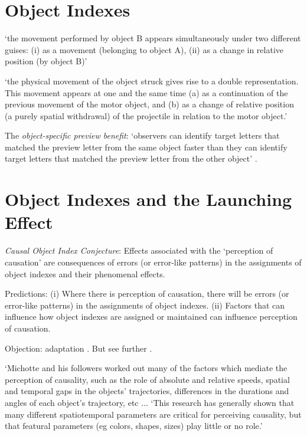 \documentclass[12pt]{extarticle}
\begin{document}
\begin{multicols*}{3}
\section{Object Indexes}

‘the movement performed by object B appears simultaneously under two
different guises: (i) as a movement (belonging to object A), (ii) as a
change in relative position (by object B)’
\citep[p.~136]{Michotte:1946nz}

‘the physical movement of the object struck gives rise to a double
representation. This movement appears at one and the same time (a) as a
continuation of the previous movement of the motor object, and (b) as a
change of relative position (a purely spatial withdrawal) of the projectile
in relation to the motor object.’
\citep[p.~140]{Michotte:1946nz}

The \emph{object-specific preview benefit}: ‘observers can identify target
letters that matched the preview letter from the same object faster than
they can identify target letters that matched the preview letter from the
other object’ \citep[p.\ 2]{Krushke:1996ge}.





\section{Object Indexes and the Launching Effect}

\emph{Causal Object Index Conjecture}:
Effects associated with the ‘perception of causation’
are consequences of errors (or error-like patterns) in the assignments of object indexes and
their phenomenal effects.

Predictions:
(i) Where there is perception of causation, there will be errors (or error-like patterns)
in the assignments of object indexes.
(ii) Factors that can influence how object indexes are assigned or maintained can influence
perception of causation.

Objection: adaptation \citep{rolfs:2013_visual}.
But see further \citet{johnston:2013_causality,arnold:2015_objectcentered}.

‘Michotte and his followers worked out many of the factors which mediate
the perception of causality, such as the role of absolute and relative
speeds, spatial and temporal gaps in the objects' trajectories, differences
in the durations and angles of each object's trajectory, etc ...
‘This research has generally shown that many different  spatiotemporal parameters are critical for perceiving causality, but  that featural parameters (eg colors, shapes, sizes) play little or no role.’
\citep[p.~456]{Scholl:2004dx}


\end{multicols*}
\end{document}
